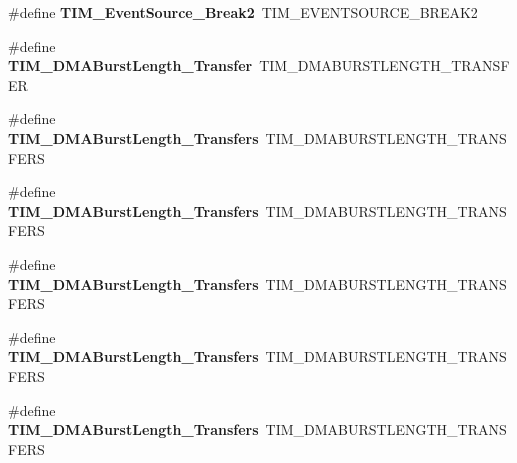 \begin{DoxyCompactItemize}
\item 
\mbox{\label{group___h_a_l___t_i_m___aliased___defines_ga18fcfb87d3361c3118e7251d5a99b92a}} 
\#define {\bfseries T\+I\+M\+\_\+\+Event\+Source\+\_\+\+Break2}~T\+I\+M\+\_\+\+E\+V\+E\+N\+T\+S\+O\+U\+R\+C\+E\+\_\+\+B\+R\+E\+A\+K2
\item 
\mbox{\label{group___h_a_l___t_i_m___aliased___defines_gab87f91f1c5583b9888cb6bb37fc639e2}} 
\#define {\bfseries T\+I\+M\+\_\+\+D\+M\+A\+Burst\+Length\+\_\+Transfer}~T\+I\+M\+\_\+\+D\+M\+A\+B\+U\+R\+S\+T\+L\+E\+N\+G\+T\+H\+\_\+T\+R\+A\+N\+S\+F\+ER
\item 
\mbox{\label{group___h_a_l___t_i_m___aliased___defines_ga829504c3e8c90a9445f6a223bc3034f8}} 
\#define {\bfseries T\+I\+M\+\_\+\+D\+M\+A\+Burst\+Length\+\_\+Transfers}~T\+I\+M\+\_\+\+D\+M\+A\+B\+U\+R\+S\+T\+L\+E\+N\+G\+T\+H\+\_\+T\+R\+A\+N\+S\+F\+E\+RS
\item 
\mbox{\label{group___h_a_l___t_i_m___aliased___defines_ga3a99863a0925e0cc9a11b91aade66f11}} 
\#define {\bfseries T\+I\+M\+\_\+\+D\+M\+A\+Burst\+Length\+\_\+Transfers}~T\+I\+M\+\_\+\+D\+M\+A\+B\+U\+R\+S\+T\+L\+E\+N\+G\+T\+H\+\_\+T\+R\+A\+N\+S\+F\+E\+RS
\item 
\mbox{\label{group___h_a_l___t_i_m___aliased___defines_ga84bfeb309593a1ac580e233bf7514b36}} 
\#define {\bfseries T\+I\+M\+\_\+\+D\+M\+A\+Burst\+Length\+\_\+Transfers}~T\+I\+M\+\_\+\+D\+M\+A\+B\+U\+R\+S\+T\+L\+E\+N\+G\+T\+H\+\_\+T\+R\+A\+N\+S\+F\+E\+RS
\item 
\mbox{\label{group___h_a_l___t_i_m___aliased___defines_ga44f8aa51fbe8887a5f3c37a0e776902c}} 
\#define {\bfseries T\+I\+M\+\_\+\+D\+M\+A\+Burst\+Length\+\_\+Transfers}~T\+I\+M\+\_\+\+D\+M\+A\+B\+U\+R\+S\+T\+L\+E\+N\+G\+T\+H\+\_\+T\+R\+A\+N\+S\+F\+E\+RS
\item 
\mbox{\label{group___h_a_l___t_i_m___aliased___defines_ga8be40a21654eea72e9c1bf9922675b22}} 
\#define {\bfseries T\+I\+M\+\_\+\+D\+M\+A\+Burst\+Length\+\_\+Transfers}~T\+I\+M\+\_\+\+D\+M\+A\+B\+U\+R\+S\+T\+L\+E\+N\+G\+T\+H\+\_\+T\+R\+A\+N\+S\+F\+E\+RS

\end{DoxyCompactItemize}
